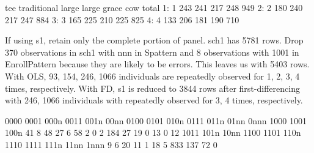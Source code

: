 \begin{Schunk}
\begin{Soutput}
   tee traditional large large grace cow total
1:   1         243   241         217 248   949
2:   2         180   240         217 247   884
3:   3         165   225         210 225   825
4:   4         133   206         181 190   710
\end{Soutput}
\end{Schunk}
If using \textsf{s1}, retain only the complete portion of panel. \textsf{sch1} has 5781 rows. Drop 370 observations in \textsf{sch1} with nnn in \textsf{Spattern} and 8 observations with 1001 in \textsf{EnrollPattern} because they are likely to be errors. This leaves us with 5403 rows. 
With OLS,  93, 154, 246, 1066 individuals are repeatedly observed for 1, 2, 3, 4 times, respectively. With FD, \textsf{s1} is reduced to 3844 rows after first-differencing with 246, 1066 individuals with repeatedly observed for 3, 4 times, respectively.
\begin{Schunk}
\begin{Soutput}

0000 0001 000n 0011 001n 00nn 0100 0101 010n 0111 011n 01nn 0nnn 1000 1001 100n 
  41    8   48   27    6   58    2    0    2  184   27   19    0   13    0   12 
1011 101n 10nn 1100 1101 110n 1110 1111 111n 11nn 1nnn 
   9    6   20   11    1   18    5  833  137   72    0 
\end{Soutput}
\end{Schunk}






